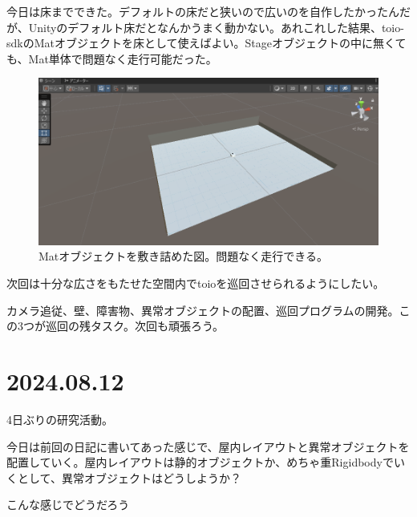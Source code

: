 \documentclass[fleqn,twocolumn]{mynote}
\begin{document}
  今日は床までできた。デフォルトの床だと狭いので広いのを自作したかったんだが、Unityのデフォルト床だとなんかうまく動かない。あれこれした結果、toio-sdkのMatオブジェクトを床として使えばよい。Stageオブジェクトの中に無くても、Mat単体で問題なく走行可能だった。

  \begin{figure}[h]
    \centering
    \includegraphics[keepaspectratio,
    width=0.8\columnwidth]{resources/2024-08-09-mat.png}
    \caption[short]{Matオブジェクトを敷き詰めた図。問題なく走行できる。}
    \label{fig:20240809-mat}
  \end{figure}

  次回は十分な広さをもたせた空間内でtoioを巡回させられるようにしたい。

  カメラ追従、壁、障害物、異常オブジェクトの配置、巡回プログラムの開発。この3つが巡回の残タスク。次回も頑張ろう。

  \section*{2024.08.12}
  4日ぶりの研究活動。

  今日は前回の日記に書いてあった感じで、屋内レイアウトと異常オブジェクトを配置していく。屋内レイアウトは静的オブジェクトか、めちゃ重Rigidbodyでいくとして、異常オブジェクトはどうしようか？

  こんな感じでどうだろう
\end{document}
